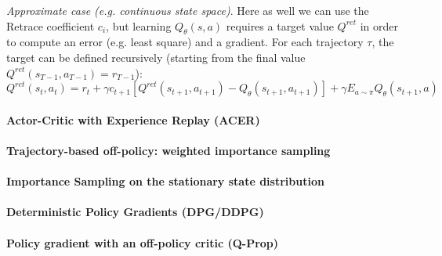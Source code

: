 \emph{Approximate case (e.g. continuous state space)}.
Here as well we can use the Retrace coefficient $c_i$, but learning $Q_\theta(s,a)$ requires a target value $Q^{ret}$ in order to compute an error (e.g. least square) and a gradient. For each trajectory $\tau$, the target can be defined recursively (starting from the final value $Q^{ret}(s_{T-1}, a_{T-1}) = r_{T-1}$):
\[
Q^{ret}(s_t, a_t) = r_t + \gamma c_{t+1} [Q^{ret}(s_{t+1}, a_{t+1}) - Q_\theta(s_{t+1}, a_{t+1})] + \gamma E_{a\sim \pi} Q_\theta(s_{t+1}, a)
\]

\paragraph{Actor-Critic with Experience Replay (ACER)}

\paragraph{Trajectory-based off-policy: weighted importance sampling}

\paragraph{Importance Sampling on the stationary state distribution}

\paragraph{Deterministic Policy Gradients (DPG/DDPG)}

\paragraph{Policy gradient with an off-policy critic (Q-Prop)}
